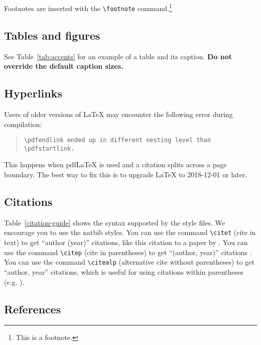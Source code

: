 \documentclass[11pt]{article}
\begin{document}
Footnotes are inserted with the \verb|\footnote| command.\footnote{This is a footnote.}

\subsection{Tables and figures}

See Table~\ref{tab:accents} for an example of a table and its caption.
\textbf{Do not override the default caption sizes.}

\subsection{Hyperlinks}

Users of older versions of \LaTeX{} may encounter the following error during compilation: 
\begin{quote}
\tt\verb|\pdfendlink| ended up in different nesting level than \verb|\pdfstartlink|.
\end{quote}
This happens when pdf\LaTeX{} is used and a citation splits across a page boundary. The best way to fix this is to upgrade \LaTeX{} to 2018-12-01 or later.

\subsection{Citations}



Table~\ref{citation-guide} shows the syntax supported by the style files.
We encourage you to use the natbib styles.
You can use the command \verb|\citet| (cite in text) to get ``author (year)'' citations, like this citation to a paper by \citet{Gusfield:97}.
You can use the command \verb|\citep| (cite in parentheses) to get ``(author, year)'' citations \citep{Gusfield:97}.
You can use the command \verb|\citealp| (alternative cite without parentheses) to get ``author, year'' citations, which is useful for using citations within parentheses (e.g. \citealp{Gusfield:97}).

\subsection{References}

\nocite{Ando2005,augenstein-etal-2016-stance,andrew2007scalable,rasooli-tetrault-2015,goodman-etal-2016-noise,harper-2014-learning}
\end{document}
